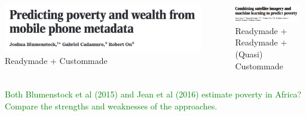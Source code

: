 \documentclass[aspectratio=169]{beamer}
\begin{document}
\begin{frame}

\begin{columns}
\begin{column}{0.5\textwidth}
\begin{center}
\includegraphics[width=0.9\textwidth]{figures/blumenstock_predicting_2015_title}\\
Readymade + Custommade
\end{center}
\end{column}
\begin{column}{0.5\textwidth}  
\begin{center}
\includegraphics[width=0.9\textwidth]{figures/jean_combining_2016_title}\\
Readymade + Readymade + (Quasi) Custommade
\end{center}
\end{column}
\end{columns}

\end{frame}
\begin{frame}

\textcolor{green}{Both Blumenstock et al (2015) and Jean et al (2016) estimate poverty in Africa?  Compare the strengths and weaknesses of the approaches.}

\end{frame}
\end{document}
